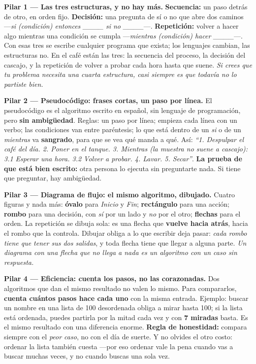 \documentclass[11pt,letterpaper]{article}
\newcommand{\milcpaso}[3]{%
\Needspace{4\baselineskip}%
\begin{tcolorbox}[enhanced,colback=white,colframe=milcLinea,arc=1.5mm,boxrule=.9pt,
  left=14mm,right=4mm,top=3mm,bottom=3mm,before skip=4pt,after skip=4pt,
  fontupper=\RaggedRight,
  overlay={\node[anchor=north west,circle,fill=#2,text=white,inner sep=0pt,
    minimum size=7.4mm,font=\sffamily\bfseries\small]
    at ([xshift=3.6mm,yshift=-3.2mm]frame.north west) {#1};}]
#3
\end{tcolorbox}}
\begin{document}
\milcpaso{1}{milcTurquesa}{\textbf{Pilar 1 --- Las tres estructuras, y no hay más.} \textbf{Secuencia:} un paso detrás de otro, en orden fijo. \textbf{Decisión:} una pregunta de sí o no que abre dos caminos ---\emph{si (condición) entonces \_\_\_\_ si no \_\_\_\_}---. \textbf{Repetición:} volver a hacer algo mientras una condición se cumpla ---\emph{mientras (condición) hacer \_\_\_\_}---. Con esas tres se escribe cualquier programa que exista; los lenguajes cambian, las estructuras no. En el café están las tres: la secuencia del proceso, la decisión del cascajo, y la repetición de volver a probar cada hora hasta que suene. \emph{Si crees que tu problema necesita una cuarta estructura, casi siempre es que todavía no lo partiste bien.}}
\milcpaso{2}{milcTurquesa}{\textbf{Pilar 2 --- Pseudocódigo: frases cortas, un paso por línea.} El pseudocódigo es el algoritmo escrito en español, sin lenguaje de programación, pero \textbf{sin ambigüedad}. Reglas: un paso por línea; empieza cada línea con un verbo; las condiciones van entre paréntesis; lo que está dentro de un \emph{si} o de un \emph{mientras} va \textbf{sangrado}, para que se vea qué manda a qué. Así: \emph{``1. Despulpar el café del día. 2. Poner en el tanque. 3. Mientras (la muestra no suene a cascajo): 3.1 Esperar una hora. 3.2 Volver a probar. 4. Lavar. 5. Secar''}. \textbf{La prueba de que está bien escrito:} otra persona lo ejecuta sin preguntarte nada. Si tiene que preguntar, hay ambigüedad.}
\milcpaso{3}{milcTurquesa}{\textbf{Pilar 3 --- Diagrama de flujo: el mismo algoritmo, dibujado.} Cuatro figuras y nada más: \textbf{óvalo} para \emph{Inicio} y \emph{Fin}; \textbf{rectángulo} para una acción; \textbf{rombo} para una decisión, con \emph{sí} por un lado y \emph{no} por el otro; \textbf{flechas} para el orden. La repetición se dibuja sola: es una flecha que \textbf{vuelve hacia atrás}, hacia el rombo que la controla. Dibujar obliga a lo que escribir deja pasar: \emph{cada rombo tiene que tener sus dos salidas}, y toda flecha tiene que llegar a alguna parte. \emph{Un diagrama con una flecha que no llega a nada es un algoritmo con un caso sin respuesta.}}
\milcpaso{4}{milcTurquesa}{\textbf{Pilar 4 --- Eficiencia: cuenta los pasos, no las corazonadas.} Dos algoritmos que dan el mismo resultado no valen lo mismo. Para compararlos, \textbf{cuenta cuántos pasos hace cada uno} con la misma entrada. Ejemplo: buscar un nombre en una lista de 100 desordenada obliga a mirar hasta 100; si la lista está ordenada, puedes partirla por la mitad cada vez y con \textbf{7 miradas} basta. Es el mismo resultado con una diferencia enorme. \textbf{Regla de honestidad:} compara siempre con el \emph{peor caso}, no con el día de suerte. Y no olvides el otro costo: ordenar la lista también cuesta ---por eso ordenar vale la pena cuando vas a buscar muchas veces, y no cuando buscas una sola vez.}
\end{document}
